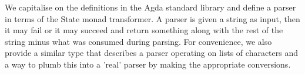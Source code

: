 We capitalise on the definitions in the Agda standard library and define
a parser in terms of the State monad transformer. A parser is given a string
as input, then it may fail or it may succeed and return something along with
the rest of the string minus what was consumed during parsing. For convenience,
we also provide a similar type that describes a parser operating on lists of
characters and a way to plumb this into a 'real' parser by making the
appropriate conversions.
\begin{code}%
\>[0]\AgdaSpace{}%
\AgdaSpace{}%
\<%
\\
\>[0][@{}l@{\AgdaIndent{0}}]%
\>[2]\AgdaSpace{}%
\AgdaSymbol{:}\AgdaSpace{}%
\AgdaSpace{}%
\AgdaSpace{}%
\<%
\\
%
\>[2]\AgdaSpace{}%
\AgdaSymbol{=}\AgdaSpace{}%
\AgdaSpace{}%
\AgdaSymbol{(}\AgdaSpace{}%
\AgdaSymbol{)}\AgdaSpace{}%
\<%
\\
\>[0]\<%
\\
%
\>[2]\AgdaSpace{}%
\AgdaSymbol{:}\AgdaSpace{}%
\AgdaSpace{}%
\AgdaSpace{}%
\<%
\\
%
\>[2]\AgdaSpace{}%
\AgdaSymbol{=}\AgdaSpace{}%
\AgdaSpace{}%
\AgdaSpace{}%
\<%
\\
\>[0]\<%
\\
%
\>[2]\AgdaSpace{}%
\AgdaSymbol{:}\AgdaSpace{}%
\AgdaSpace{}%
\AgdaSpace{}%
\AgdaSpace{}%
\AgdaSpace{}%
\<%
\\
%
\>[2]\AgdaOperator{\AgdaFunction{→[}}\AgdaSpace{}%
\AgdaSpace{}%
\AgdaOperator{\AgdaFunction{]→}}%
\>[12]\AgdaSpace{}%
\AgdaSymbol{=}%
\>[139I]\<%
\\
\>[139I][@{}l@{\AgdaIndent{0}}]%
\>[20]\AgdaSymbol{(}\AgdaSpace{}%
\AgdaOperator{\AgdaInductiveConstructor{,}}\AgdaSpace{}%
\AgdaSymbol{)}\AgdaSpace{}%
\AgdaSpace{}%
\AgdaSymbol{(}\AgdaSpace{}%
\AgdaSpace{}%
\AgdaSymbol{)}\AgdaSpace{}%
\<%
\\
%
\>[20]\AgdaSpace{}%
\AgdaSymbol{((}\AgdaSpace{}%
\AgdaOperator{\AgdaInductiveConstructor{,}}\AgdaSpace{}%
\AgdaSpace{}%
\AgdaSymbol{))}\<%
\\
\>[.][@{}l@{}]\<[139I]%
\>[18]\AgdaSpace{}%
\AgdaSpace{}%
\<%
\end{code}
